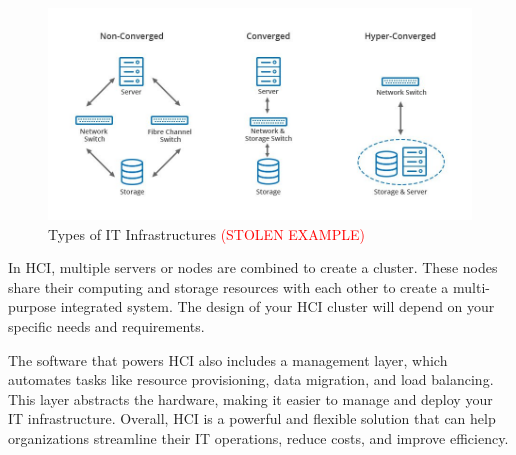 \begin{figure}[H]
    \centering
    \includegraphics[scale = 0.5]{images/HCI_tldr.jpg}
    \caption{Types of IT Infrastructures \textcolor{red}{(STOLEN EXAMPLE)}}
    \label{HCI Convergance Comparison}
\end{figure}

In HCI, multiple servers or nodes are combined to create a cluster. These nodes share their computing and storage resources with each other to create a multi-purpose integrated system. The design of your HCI cluster will depend on your specific needs and requirements.

The software that powers HCI also includes a management layer, which automates tasks like resource provisioning, data migration, and load balancing. This layer abstracts the hardware, making it easier to manage and deploy your IT infrastructure. Overall, HCI is a powerful and flexible solution that can help organizations streamline their IT operations, reduce costs, and improve efficiency.
